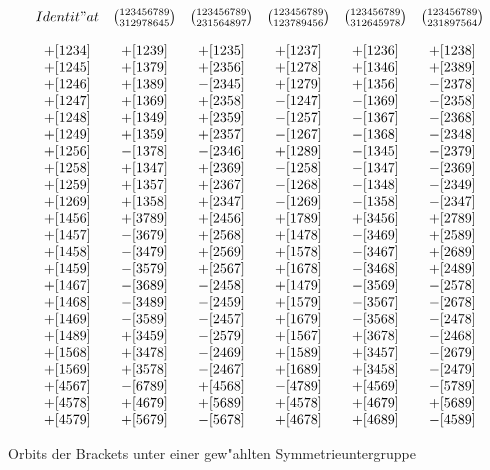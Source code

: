 \begin{table}[htb]
{\small
$$
\begin{array}{cccccc}
Identit"at                   & {123456789\choose 312978645} &
{123456789\choose 231564897} & {123456789\choose 123789456} &
{123456789\choose 312645978} & {123456789\choose 231897564}\\
        &         &         &         &         &        \\
+[1234] & +[1239] & +[1235] & +[1237] & +[1236] & +[1238]\\
+[1245] & +[1379] & +[2356] & +[1278] & +[1346] & +[2389]\\
+[1246] & +[1389] & -[2345] & +[1279] & +[1356] & -[2378]\\
+[1247] & +[1369] & +[2358] & -[1247] & -[1369] & -[2358]\\
+[1248] & +[1349] & +[2359] & -[1257] & -[1367] & -[2368]\\
+[1249] & +[1359] & +[2357] & -[1267] & -[1368] & -[2348]\\
+[1256] & -[1378] & -[2346] & +[1289] & -[1345] & -[2379]\\
+[1258] & +[1347] & +[2369] & -[1258] & -[1347] & -[2369]\\
+[1259] & +[1357] & +[2367] & -[1268] & -[1348] & -[2349]\\
+[1269] & +[1358] & +[2347] & -[1269] & -[1358] & -[2347]\\
+[1456] & +[3789] & +[2456] & +[1789] & +[3456] & +[2789]\\
+[1457] & -[3679] & +[2568] & +[1478] & -[3469] & +[2589]\\
+[1458] & -[3479] & +[2569] & +[1578] & -[3467] & +[2689]\\
+[1459] & -[3579] & +[2567] & +[1678] & -[3468] & +[2489]\\
+[1467] & -[3689] & -[2458] & +[1479] & -[3569] & -[2578]\\
+[1468] & -[3489] & -[2459] & +[1579] & -[3567] & -[2678]\\
+[1469] & -[3589] & -[2457] & +[1679] & -[3568] & -[2478]\\
+[1489] & +[3459] & -[2579] & +[1567] & +[3678] & -[2468]\\
+[1568] & +[3478] & -[2469] & +[1589] & +[3457] & -[2679]\\
+[1569] & +[3578] & -[2467] & +[1689] & +[3458] & -[2479]\\
+[4567] & -[6789] & +[4568] & -[4789] & +[4569] & -[5789]\\
+[4578] & +[4679] & +[5689] & +[4578] & +[4679] & +[5689]\\
+[4579] & +[5679] & -[5678] & +[4678] & +[4689] & -[4589]
\end{array}$$}
\caption{Orbits der Brackets unter einer gew"ahlten Symmetrieuntergruppe}
\label{tab}
\end{table}

